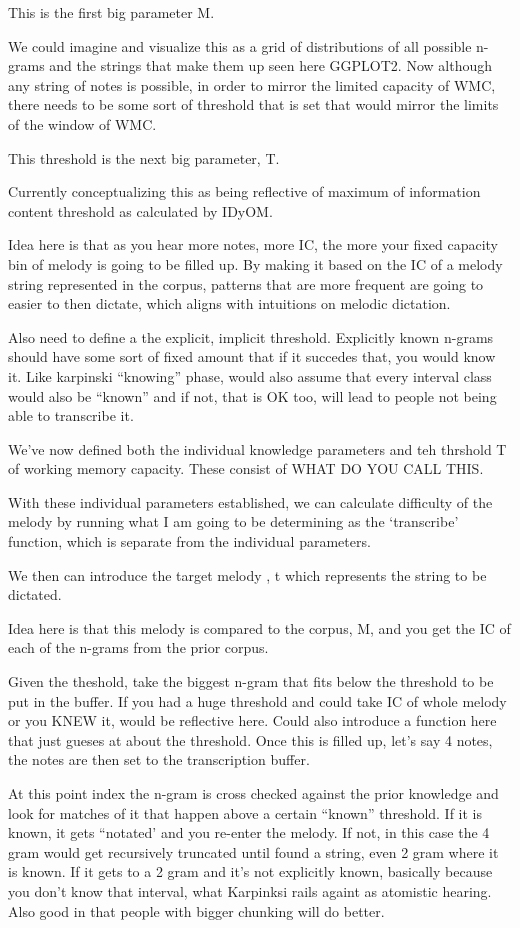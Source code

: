 \documentclass[]{book}
\theoremstyle{definition}
\theoremstyle{definition}
\theoremstyle{definition}
\theoremstyle{remark}
\begin{document}
This is the first big parameter M.

We could imagine and visualize this as a grid of distributions of all
possible n-grams and the strings that make them up seen here GGPLOT2.
Now although any string of notes is possible, in order to mirror the
limited capacity of WMC, there needs to be some sort of threshold that
is set that would mirror the limits of the window of WMC.

This threshold is the next big parameter, T.

Currently conceptualizing this as being reflective of maximum of
information content threshold as calculated by IDyOM.

Idea here is that as you hear more notes, more IC, the more your fixed
capacity bin of melody is going to be filled up. By making it based on
the IC of a melody string represented in the corpus, patterns that are
more frequent are going to easier to then dictate, which aligns with
intuitions on melodic dictation.

Also need to define a the explicit, implicit threshold. Explicitly known
n-grams should have some sort of fixed amount that if it succedes that,
you would know it. Like karpinski ``knowing'' phase, would also assume
that every interval class would also be ``known'' and if not, that is OK
too, will lead to people not being able to transcribe it.

We've now defined both the individual knowledge parameters and teh
thrshold T of working memory capacity. These consist of WHAT DO YOU CALL
THIS.

With these individual parameters established, we can calculate
difficulty of the melody by running what I am going to be determining as
the `transcribe' function, which is separate from the individual
parameters.

We then can introduce the target melody , t which represents the string
to be dictated.

Idea here is that this melody is compared to the corpus, M, and you get
the IC of each of the n-grams from the prior corpus.

Given the theshold, take the biggest n-gram that fits below the
threshold to be put in the buffer. If you had a huge threshold and could
take IC of whole melody or you KNEW it, would be reflective here. Could
also introduce a function here that just gueses at about the threshold.
Once this is filled up, let's say 4 notes, the notes are then set to the
transcription buffer.

At this point index the n-gram is cross checked against the prior
knowledge and look for matches of it that happen above a certain
``known'' threshold. If it is known, it gets ``notated' and you re-enter
the melody. If not, in this case the 4 gram would get recursively
truncated until found a string, even 2 gram where it is known. If it
gets to a 2 gram and it's not explicitly known, basically because you
don't know that interval, what Karpinksi rails againt as atomistic
hearing. Also good in that people with bigger chunking will do better.
\end{document}
